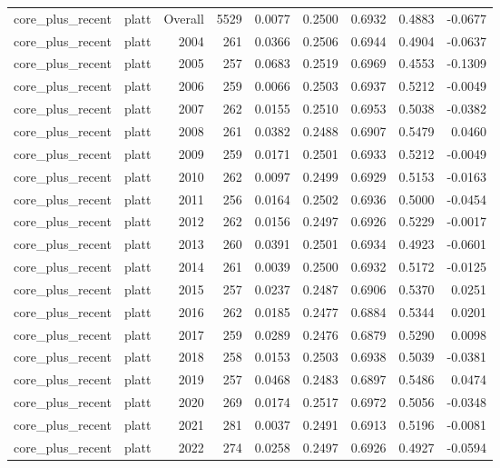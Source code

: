 \begin{table}[t]
\begin{tabular}{@{} l l r r r r r r r @{} }
      core\_plus\_recent & platt & Overall & 5529 & 0.0077 & 0.2500 & 0.6932 & 0.4883 & -0.0677 \\
      core\_plus\_recent & platt & 2004 & 261 & 0.0366 & 0.2506 & 0.6944 & 0.4904 & -0.0637 \\
      core\_plus\_recent & platt & 2005 & 257 & 0.0683 & 0.2519 & 0.6969 & 0.4553 & -0.1309 \\
      core\_plus\_recent & platt & 2006 & 259 & 0.0066 & 0.2503 & 0.6937 & 0.5212 & -0.0049 \\
      core\_plus\_recent & platt & 2007 & 262 & 0.0155 & 0.2510 & 0.6953 & 0.5038 & -0.0382 \\
      core\_plus\_recent & platt & 2008 & 261 & 0.0382 & 0.2488 & 0.6907 & 0.5479 & 0.0460 \\
      core\_plus\_recent & platt & 2009 & 259 & 0.0171 & 0.2501 & 0.6933 & 0.5212 & -0.0049 \\
      core\_plus\_recent & platt & 2010 & 262 & 0.0097 & 0.2499 & 0.6929 & 0.5153 & -0.0163 \\
      core\_plus\_recent & platt & 2011 & 256 & 0.0164 & 0.2502 & 0.6936 & 0.5000 & -0.0454 \\
      core\_plus\_recent & platt & 2012 & 262 & 0.0156 & 0.2497 & 0.6926 & 0.5229 & -0.0017 \\
      core\_plus\_recent & platt & 2013 & 260 & 0.0391 & 0.2501 & 0.6934 & 0.4923 & -0.0601 \\
      core\_plus\_recent & platt & 2014 & 261 & 0.0039 & 0.2500 & 0.6932 & 0.5172 & -0.0125 \\
      core\_plus\_recent & platt & 2015 & 257 & 0.0237 & 0.2487 & 0.6906 & 0.5370 & 0.0251 \\
      core\_plus\_recent & platt & 2016 & 262 & 0.0185 & 0.2477 & 0.6884 & 0.5344 & 0.0201 \\
      core\_plus\_recent & platt & 2017 & 259 & 0.0289 & 0.2476 & 0.6879 & 0.5290 & 0.0098 \\
      core\_plus\_recent & platt & 2018 & 258 & 0.0153 & 0.2503 & 0.6938 & 0.5039 & -0.0381 \\
      core\_plus\_recent & platt & 2019 & 257 & 0.0468 & 0.2483 & 0.6897 & 0.5486 & 0.0474 \\
      core\_plus\_recent & platt & 2020 & 269 & 0.0174 & 0.2517 & 0.6972 & 0.5056 & -0.0348 \\
      core\_plus\_recent & platt & 2021 & 281 & 0.0037 & 0.2491 & 0.6913 & 0.5196 & -0.0081 \\
      core\_plus\_recent & platt & 2022 & 274 & 0.0258 & 0.2497 & 0.6926 & 0.4927 & -0.0594 \\

\end{tabular}
\end{table}
